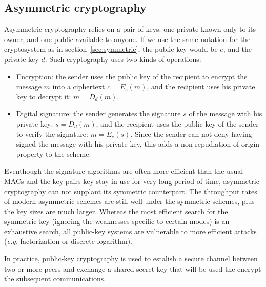 \subsection{Asymmetric cryptography}
Asymmetric cryptography relies on a pair of keys: one private known only to its owner, and one public available to anyone.
If we use the same notation for the cryptosystem as in section~\ref{sec:symmetric}, the public key would be $e$, and the private key $d$.
Such cryptography uses two kinds of operations: 
\begin{itemize}
	\item Encryption: the sender uses the public key of the recipient to encrypt the message $m$ into a ciphertext $c = E_e(m)$, and the recipient uses his private key to decrypt it: $m = D_d(m)$.
	\item Digital signature: the sender generates the signature $s$ of the message with his private key: $s = D_d(m)$, and the recipient uses the public key of the sender to verify the signature: $m = E_e(s)$.
	Since the sender can not deny having signed the message with his private key, this adds a non-repudiation of origin property to the scheme.
\end{itemize}

Eventhough the signature algorithms are often more efficient than the usual MACs and the key pairs key stay in use for very long period of time, asymmetric cryptography can not supplant its symmetric counterpart.
The throughput rates of modern asymmetric schemes are still well under the symmetric schemes, plus the key sizes are much larger.
Whereas the most efficient search for the symmetric key (ignoring the weaknesses specific to certain modes) is an exhaustive search, all public-key systems are vulnerable to more efficient attacks (\textit{e.g.} factorization or discrete logarithm).

In practice, public-key cryptography is used to estalish a secure channel between two or more peers and exchange a shared secret key that will be used the encrypt the subsequent communications.


